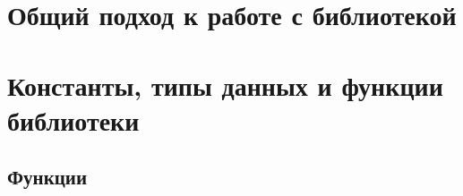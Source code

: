 \documentclass[12pt,a4paper,titlepage]{report}
\begin{document}
\chapter{Общий подход к работе с библиотекой}


  
\chapter{Константы, типы данных и функции библиотеки}



%
%
%
\section{Функции}











\end{document}
